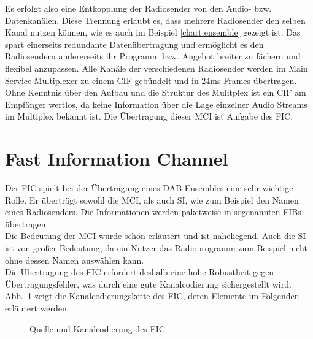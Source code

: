 Es erfolgt also eine Entkopplung der Radiosender von den Audio- bzw. Datenkanälen. Diese Trennung erlaubt es, dass mehrere Radiosender den selben Kanal nutzen können, wie es auch im Beispiel \ref{chart:ensemble} gezeigt ist. Das spart einerseits redundante Datenübertragung und ermöglicht es den Radiosendern andererseits ihr Programm bzw. Angebot breiter zu fächern und flexibel anzupassen. Alle Kanäle der verschiedenen Radiosender werden im Main Service Multiplexer zu einem \ac{CIF} gebündelt und in 24ms Frames übertragen. \\

Ohne Kenntnis über den Aufbau und die Struktur des Mulitplex ist ein \ac{CIF} am Empfänger wertlos, da keine Information über die Lage einzelner Audio Streams im Multiplex bekannt ist. Die Übertragung dieser \ac{MCI} ist Aufgabe des \ac{FIC}.

\section{Fast Information Channel}
\label{sec:FIC}
Der \ac{FIC} spielt bei der Übertragung eines DAB Ensembles eine sehr wichtige Rolle. Er überträgt sowohl die \ac{MCI}, als auch \ac{SI}, wie zum Beispiel den Namen eines Radiosenders. Die Informationen werden paketweise in sogenannten \acp{FIB} übertragen.\\
Die Bedeutung der \ac{MCI} wurde schon erläutert und ist naheliegend. Auch die \ac{SI} ist von großer Bedeutung, da ein Nutzer das Radioprogramm zum Beispiel nicht ohne dessen Namen auswählen kann. \\
Die Übertragung des FIC erfordert deshalb eine hohe Robustheit gegen Übertragungsfehler, was durch eine gute Kanalcodierung sichergestellt wird. Abb.~\ref{chart:fic_encoder} zeigt die Kanalcodierungskette des FIC, deren Elemente im Folgenden erläutert werden.\\
\begin{figure} [htb]
\begin{center}
\end{center}
\caption{Quelle und Kanalcodierung des FIC}
\label{chart:fic_encoder}
\end{figure}

